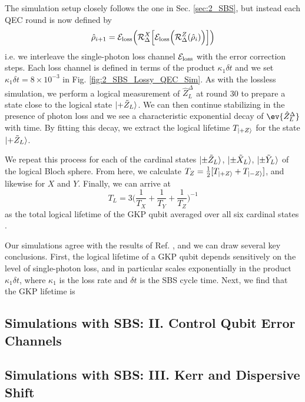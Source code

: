 The simulation setup closely follows the one in Sec. \ref{sec:2_SBS}, but instead each QEC round is now defined by
\begin{equation}
    \hat{\rho}_{i + 1} =  \mathcal{E}_{\rm loss}\Big(\mathcal{R}_\Delta^X\Big[\mathcal{E}_{\rm loss}\Big(\mathcal{R}_\Delta^Z(\hat{\rho}_i)\Big)\Big]\Big)
\end{equation}
i.e. we interleave the single-photon loss channel $\mathcal{E}_{\rm loss}$ with the error correction steps. Each loss channel is defined in terms of the product $\kappa_1 \delta t$ and we set $\kappa_1 \delta t = 8 \times 10^{-3}$ in Fig. \ref{fig:2_SBS_Lossy_QEC_Sim}. As with the lossless simulation, we perform a logical measurement of $\hat{Z}_L^\Delta$ at round 30 to prepare a state close to the logical state $\lvert+\tilde{Z}_L\rangle$. We can then continue stabilizing in the presence of photon loss and we see a characteristic exponential decay of $\ev{\hat{Z}_L^\Delta}$ with time. By fitting this decay, we extract the logical lifetime $T_{\lvert+Z\rangle}$ for the state $\lvert+\tilde{Z}_L\rangle$. 

We repeat this process for each of the cardinal states $\lvert\pm \tilde{Z}_L\rangle$, $\lvert\pm \tilde{X}_L\rangle$, $\lvert\pm \tilde{Y}_L\rangle$ of the logical Bloch sphere. From here, we calculate $T_Z = \frac{1}{2}[T_{\lvert+Z\rangle} + T_{\lvert-Z\rangle}]$, and likewise for $X$ and $Y$. Finally, we can arrive at
\begin{equation}
    T_L = 3\bigg(\frac{1}{T_X} + \frac{1}{T_Y} + \frac{1}{T_Z}\bigg)^{-1}
\end{equation}
as the total logical lifetime of the GKP qubit averaged over all six cardinal states \cite{royer2020gkp, sivak2023gkp-expt}. 


Our simulations agree with the results of Ref. \cite{royer2020gkp}, and we can draw several key conclusions. First, the logical lifetime of a GKP qubit depends sensitively on the level of single-photon loss, and in particular scales exponentially in the product $\kappa_1\delta t$, where $\kappa_1$ is the loss rate and $\delta t$ is the SBS cycle time. Next, we find that the GKP lifetime is  



\subsection{Simulations with SBS: II. Control Qubit Error Channels}

\subsection{Simulations with SBS: III. Kerr and Dispersive Shift}

